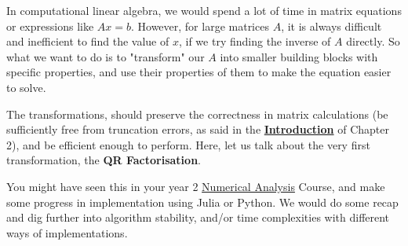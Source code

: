In computational linear algebra, we would spend a lot of time in matrix equations or expressions like $Ax = b$. However, for large matrices  $A$, it is always difficult and inefficient to find the value of $x$, if we try finding the inverse of $A$ directly. So what we want to do is to "transform" our $A$ into smaller building blocks with specific properties, and use their properties of them to make the equation easier to solve. 

\medskip
\noindent The transformations, should preserve the correctness in matrix calculations (be sufficiently free from truncation errors, as said in the \href{https://comp-lin-alg.github.io/L2_QR_factorisation.html#what-is-the-qr-factorisation}{\textbf{Introduction}} of Chapter 2), and be efficient enough to perform. Here, let us talk about the very first transformation, the \textbf{QR Factorisation}. 
\medskip

\noindent You might have seen this in your year 2 \href{https://github.com/Imperial-MATH50003/MATH50003NumericalAnalysis}{Numerical Analysis} Course, and make some progress in implementation using Julia or Python. We would do some recap and dig further into algorithm stability, and/or time complexities with different ways of implementations.
\newpage
